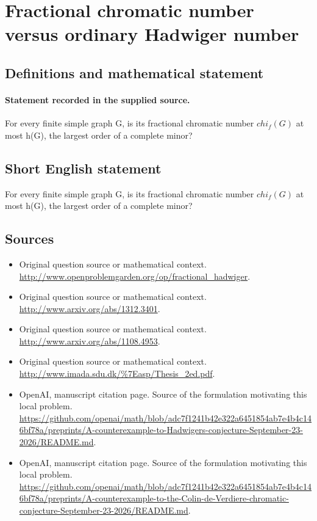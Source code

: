 \documentclass[11pt]{article}
\begin{document}
\section*{Fractional chromatic number versus ordinary Hadwiger number}\label{30007086}
\subsection{Definitions and mathematical statement}
\paragraph{Statement recorded in the supplied source.}
For every finite simple graph G, is its fractional chromatic number $chi_f(G)$ at most h(G), the largest order of a complete minor?
\subsection{Short English statement}
For every finite simple graph G, is its fractional chromatic number $chi_f(G)$ at most h(G), the largest order of a complete minor?
\subsection{Sources}
\begin{itemize}
\item[S1] Original question source or mathematical context.
\url{http://www.openproblemgarden.org/op/fractional_hadwiger}.
\item[S2] Original question source or mathematical context.
\url{http://www.arxiv.org/abs/1312.3401}.
\item[S3] Original question source or mathematical context.
\url{http://www.arxiv.org/abs/1108.4953}.
\item[S4] Original question source or mathematical context.
\url{http://www.imada.sdu.dk/%7Easp/Thesis_2ed.pdf}.
\item[S5] OpenAI, manuscript citation page. Source of the formulation motivating this local problem.
\url{https://github.com/openai/math/blob/adc7f1241b42e322a6451854ab7e4b4c146bf78a/preprints/A-counterexample-to-Hadwigers-conjecture-September-23-2026/README.md}.
\item[S6] OpenAI, manuscript citation page. Source of the formulation motivating this local problem.
\url{https://github.com/openai/math/blob/adc7f1241b42e322a6451854ab7e4b4c146bf78a/preprints/A-counterexample-to-the-Colin-de-Verdiere-chromatic-conjecture-September-23-2026/README.md}.
\end{itemize}
\end{document}
